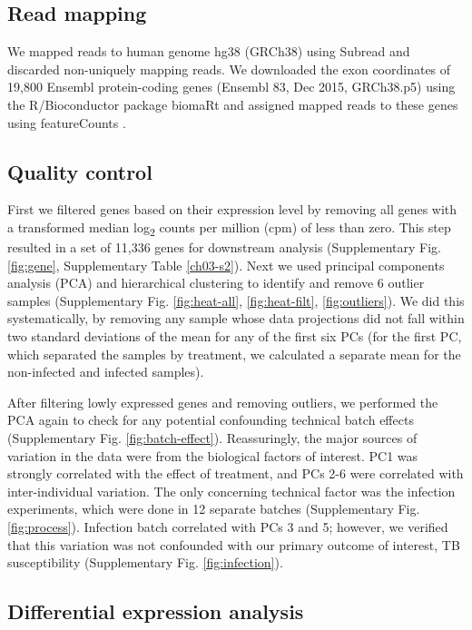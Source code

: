 \subsection{Read mapping}

We mapped reads to human genome hg38 (GRCh38) using Subread
\citep{Liao2013} and discarded non-uniquely mapping reads. We
downloaded the exon coordinates of 19,800 Ensembl \citep{Yates2016}
protein-coding genes (Ensembl 83, Dec 2015, GRCh38.p5) using the
R/Bioconductor \citep{Huber2015} package biomaRt \citep{Durinck2005,
  Durinck2009} and assigned mapped reads to these genes using
featureCounts \citep{Liao2014}.
\subsection{Quality control}

First we filtered genes based on their expression level by removing
all genes with a transformed median log\textsubscript{2} counts per
million (cpm) of less than zero. This step resulted in a set of 11,336
genes for downstream analysis (Supplementary Fig. \ref{fig:gene},
Supplementary Table \ref{ch03-s2}). Next we used principal components
analysis (PCA) and hierarchical clustering to identify and remove 6
outlier samples (Supplementary Fig. \ref{fig:heat-all},
\ref{fig:heat-filt}, \ref{fig:outliers}). We did this systematically,
by removing any sample whose data projections did not fall within two
standard deviations of the mean for any of the first six PCs (for the
first PC, which separated the samples by treatment, we calculated a
separate mean for the non-infected and infected samples).

After filtering lowly expressed genes and removing outliers, we
performed the PCA again to check for any potential confounding
technical batch effects (Supplementary Fig. \ref{fig:batch-effect}).
Reassuringly, the major sources of variation in the data were from the
biological factors of interest. PC1 was strongly correlated with the
effect of treatment, and PCs 2-6 were correlated with inter-individual
variation. The only concerning technical factor was the infection
experiments, which were done in 12 separate batches (Supplementary
Fig. \ref{fig:process}). Infection batch correlated with PCs 3 and 5;
however, we verified that this variation was not confounded with our
primary outcome of interest, TB susceptibility (Supplementary Fig.
\ref{fig:infection}).
\subsection{Differential expression analysis}

